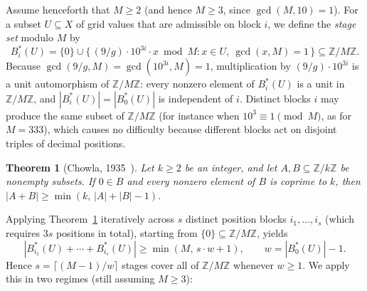 \documentclass[11pt]{article}
\newtheorem{theorem}{Theorem}
\theoremstyle{remark}
\newcommand{\Z}{\mathbb{Z}}
\begin{document}
Assume henceforth that $M \ge 2$ (and hence $M \ge 3$, since $\gcd(M,10)=1$).
For a subset $U \subseteq X$ of grid values that are admissible on block $i$,
we define the \emph{stage set} modulo $M$ by
\[
 B^*_i(U) = \{0\} \cup \{\, (9/g)\cdot 10^{3i}\cdot x \bmod M :
 x \in U,\ \gcd(x,M) = 1 \,\} \subseteq \Z/M\Z .
\]
Because $\gcd(9/g,M) = \gcd(10^{3i},M) = 1$, multiplication by $(9/g)\cdot 10^{3i}$
is a unit automorphism of $\Z/M\Z$: every nonzero element of $B^*_i(U)$ is a
unit in $\Z/M\Z$, and $|B^*_i(U)| = |B^*_0(U)|$ is independent of $i$. Distinct
blocks $i$ may produce the same subset of $\Z/M\Z$ (for instance when $10^3
\equiv 1 \pmod M$, as for $M = 333$), which causes no difficulty because
different blocks act on disjoint triples of decimal positions.

\begin{theorem}[Chowla, 1935~\cite{chowla}]
\label{thm:chowla}
Let $k \ge 2$ be an integer, and let $A, B \subseteq \Z/k\Z$ be nonempty subsets.
If $0 \in B$ and every nonzero element of $B$ is coprime to $k$, then
$|A+B| \ge \min(k,\,|A|+|B|-1)$.
\end{theorem}

Applying Theorem~\ref{thm:chowla} iteratively across $s$ distinct position
blocks $i_1, \dots, i_s$ (which requires $3s$ positions in total), starting
from $\{0\} \subseteq \Z/M\Z$, yields
\[
 |B^*_{i_1}(U) + \cdots + B^*_{i_s}(U)| \ge \min(M,\, s\cdot w + 1),
 \qquad w = |B^*_0(U)| - 1 .
\]
Hence $s = \lceil (M-1)/w \rceil$ stages cover all of $\Z/M\Z$ whenever $w \ge 1$.
We apply this in two regimes (still assuming $M \ge 3$):
\end{document}
